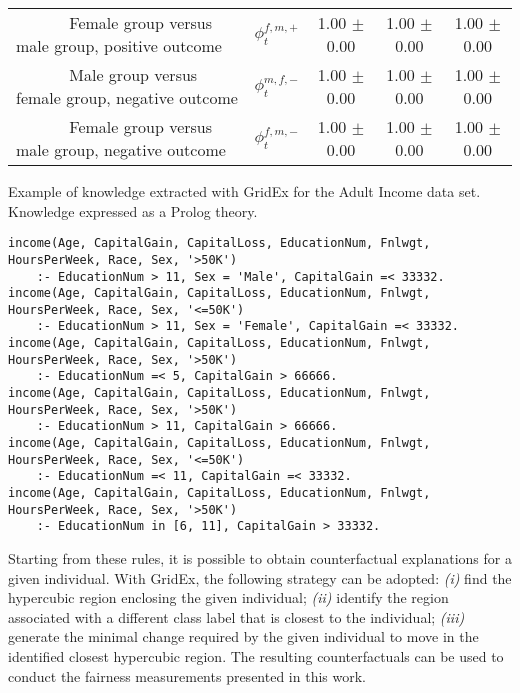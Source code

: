 \documentclass[letterpaper]{article} %
\begin{document}
\begin{table*}[t!]
\begin{center}
\begin{tabular}{ll|c|c|c}
			~ ~ ~ ~ Female group versus male group, positive outcome & $\phi_t^{f,m,+}$ & 1.00 $\pm$ 0.00 & 1.00 $\pm$ 0.00 & 1.00 $\pm$ 0.00 \\
			~ ~ ~ ~ Male group versus female group, negative outcome & $\phi_t^{m,f,-}$ & 1.00 $\pm$ 0.00 & 1.00 $\pm$ 0.00 & 1.00 $\pm$ 0.00 \\
			~ ~ ~ ~ Female group versus male group, negative outcome & $\phi_t^{f,m,-}$ & 1.00 $\pm$ 0.00 & 1.00 $\pm$ 0.00 & 1.00 $\pm$ 0.00 \\
			\bottomrule
		\end{tabular}
	\end{center}
\end{table*}

\begin{listing*}[t!]
	\caption{Example of knowledge extracted with GridEx for the Adult Income data set. Knowledge expressed as a Prolog theory.}\label{lst:rules}
	\begin{lstlisting}[]
income(Age, CapitalGain, CapitalLoss, EducationNum, Fnlwgt, HoursPerWeek, Race, Sex, '>50K') 
    :- EducationNum > 11, Sex = 'Male', CapitalGain =< 33332.
income(Age, CapitalGain, CapitalLoss, EducationNum, Fnlwgt, HoursPerWeek, Race, Sex, '<=50K') 
    :- EducationNum > 11, Sex = 'Female', CapitalGain =< 33332.
income(Age, CapitalGain, CapitalLoss, EducationNum, Fnlwgt, HoursPerWeek, Race, Sex, '>50K') 
    :- EducationNum =< 5, CapitalGain > 66666.
income(Age, CapitalGain, CapitalLoss, EducationNum, Fnlwgt, HoursPerWeek, Race, Sex, '>50K') 
    :- EducationNum > 11, CapitalGain > 66666.
income(Age, CapitalGain, CapitalLoss, EducationNum, Fnlwgt, HoursPerWeek, Race, Sex, '<=50K') 
    :- EducationNum =< 11, CapitalGain =< 33332.
income(Age, CapitalGain, CapitalLoss, EducationNum, Fnlwgt, HoursPerWeek, Race, Sex, '>50K') 
    :- EducationNum in [6, 11], CapitalGain > 33332.
	\end{lstlisting}
\end{listing*}

Starting from these rules, it is possible to obtain counterfactual explanations for a given individual. With GridEx, the following strategy can be adopted: \textit{(i)} find the hypercubic region enclosing the given individual; \textit{(ii)} identify the region associated with a different class label that is closest to the individual; \textit{(iii)} generate the minimal change required by the given individual to move in the identified closest hypercubic region.
%
The resulting counterfactuals can be used to conduct the fairness measurements presented in this work.
\end{document}
